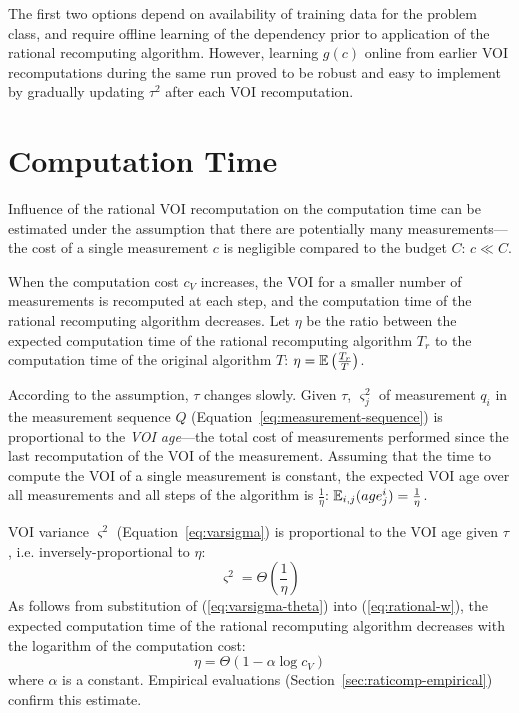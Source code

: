The first two options depend on availability of training data for the
problem class, and require offline learning of the dependency prior to
application of the rational recomputing algorithm. However, learning
$g(c)$ online from earlier VOI recomputations during
the same run proved to be robust and easy to implement by gradually
updating $\tau^2$ after each VOI recomputation.

\section{ Computation Time}
\label{sec:raticomp-comptime}

Influence of the rational VOI recomputation on the computation time
can be estimated under the assumption that there are potentially many
measurements---the cost of a single measurement $c$ is negligible
compared to the budget $C$: $c \ll C$.

When the computation cost $c_V$ increases, the VOI for a smaller
number of measurements is recomputed at each step, and the computation
time of the rational recomputing algorithm decreases. Let $\eta$ be
the ratio between the expected computation time of the rational
recomputing algorithm $T_r$ to the computation time of the original
algorithm $T$: $\eta=\mathbb{E}\left(\frac {T_r} T\right)$.

According to the assumption, $\tau$ changes slowly. Given $\tau$,
$\varsigma_j^2$ of measurement $q_i$ in the measurement sequence $Q$
(Equation~\ref{eq:measurement-sequence}) is proportional to
the {\em VOI age}---the total cost of measurements performed since the
last recomputation of the VOI of the measurement. Assuming that the
time to compute the VOI of a single measurement is constant, the
expected VOI age over all measurements and all steps of the algorithm
is $\frac 1 \eta$: $\mathbb{E}_{i,j}(age_j^i)=\frac 1 \eta$.

VOI variance $\varsigma^2$ (Equation~\ref{eq:varsigma}) is proportional to
the VOI age given $\tau$, i.e. inversely-proportional to $\eta$:
\begin{equation}
\varsigma^2=\Theta\left(\frac 1 \eta\right)
\label{eq:varsigma-theta}
\end{equation}
As follows from substitution of (\ref{eq:varsigma-theta}) into
(\ref{eq:rational-w}), the expected computation time of the rational
recomputing algorithm decreases with the logarithm of the computation
cost:
\begin{equation}
\eta=\Theta\left(1-\alpha\log c_V\right)
\label{eq:eta}
\end{equation}
where $\alpha$ is a constant.  Empirical evaluations
(Section~\ref{sec:raticomp-empirical}) confirm this estimate.

